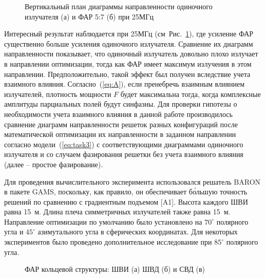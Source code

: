 \begin{figure}
\begin{minipage}[h]{0.49\linewidth}
\end{minipage}
\hfill
\begin{minipage}[h]{0.49\linewidth}
\end{minipage}
\caption{Вертикальный план диаграммы направленности одиночного излучателя (а) и ФАР 5:7 (б) при 25МГц}
\label{ris:f25mhs}
\end{figure}

Интересный результат наблюдается при 25МГц (см~Рис.~\ref{ris:f25mhs}), где усиление ФАР существенно больше усиления одиночного излучателя. Сравнение их диаграмм направленности показывает, что одиночный излучатель довольно плохо излучает в направлении оптимизации, тогда как ФАР имеет максимум излучения в этом направлении. Предположительно, такой эффект был получен вследствие учета взаимного влияния. Согласно~(\ref{eq:A}), если пренебречь взаимным влиянием излучателей, плотность мощности $F$ будет максимальна тогда, когда комплексные амплитуды парциальных полей будут синфазны. Для проверки гипотезы о необходимости учета взаимного влияния в данной работе производилось сравнение диаграмм направленности решеток разных конфигураций после математической оптимизации их направленности в заданном направлении согласно модели~(\ref{eq:task3}) с соответствующими диаграммами одиночного излучателя и со случаем фазирования решетки без учета взаимного влияния (далее – простое фазирование).

Для проведения вычислительного эксперимента использовался решатель BARON в пакете GAMS, поскольку, как правило, он обеспечивает б\'{о}льшую точность решений по сравнению с градиентным подъемом [A1]. Высота каждого ШВИ равна 15~м. Длина плеча симметричных излучателей также равна 15~м. Направление оптимизации по умолчанию было установлено на $70^{\circ}$ полярного угла и $45^{\circ}$ азимутального угла в сферических координатах. Для некоторых экспериментов было проведено дополнительное исследование при $85^{\circ}$ полярного угла.


\begin{figure}
    \begin{minipage}[h]{0.49\linewidth}
    \end{minipage}
    \hfill
    \begin{minipage}[h]{0.49\linewidth}
    \end{minipage}
    \begin{minipage}[h]{1\linewidth}
    \end{minipage}
    \caption{ФАР кольцевой структуры: ШВИ (а) ШВД (б) и СВД (в)}
    \label{pic:r_paas}
\end{figure}

